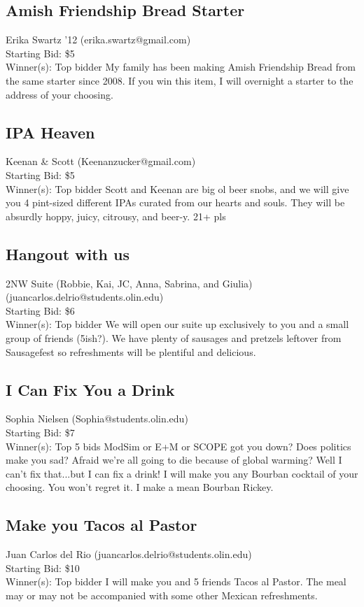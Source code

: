 \documentclass[11pt]{article}
\begin{document}
\subsection{Amish Friendship Bread Starter}
Erika Swartz '12  (erika.swartz@gmail.com) \\
Starting Bid: \$5 \\
Winner(s): 
Top bidder\newline
My family has been making Amish Friendship Bread from the same starter since 2008. If you win this item, I will overnight a starter to the address of your choosing.
\subsection{IPA Heaven }
Keenan \& Scott (Keenanzucker@gmail.com) \\
Starting Bid: \$5 \\
Winner(s): 
Top bidder\newline
Scott and Keenan are big ol beer snobs, and we will give you 4 pint-sized different IPAs curated from our hearts and souls. They will be absurdly hoppy, juicy, citrousy, and beer-y. 21+ pls
\subsection{Hangout with us}
2NW Suite (Robbie, Kai, JC, Anna, Sabrina, and Giulia) (juancarlos.delrio@students.olin.edu) \\
Starting Bid: \$6 \\
Winner(s): 
Top bidder\newline
We will open our suite up exclusively to you and a small group of friends (5ish?). We have plenty of sausages and pretzels leftover from Sausagefest so refreshments will be plentiful and delicious.
\subsection{I Can Fix You a Drink}
Sophia Nielsen (Sophia@students.olin.edu) \\
Starting Bid: \$7 \\
Winner(s): 
Top 5 bids\newline
ModSim or E+M or SCOPE got you down? Does politics make you sad? Afraid we're all going to die because of global warming? Well I can't fix that...but I can fix a drink! I will make you any Bourban cocktail of your choosing. You won't regret it. I make a mean Bourban Rickey.
\subsection{Make you Tacos al Pastor}
Juan Carlos del Rio (juancarlos.delrio@students.olin.edu) \\
Starting Bid: \$10 \\
Winner(s): 
Top bidder\newline
I will make you and 5 friends Tacos al Pastor. The meal may or may not be accompanied with some other Mexican refreshments.
\end{document}
